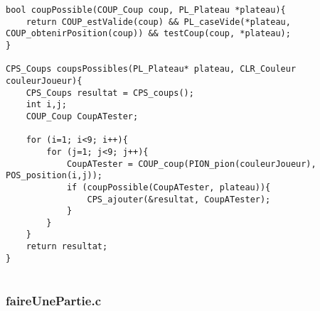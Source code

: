 \begin{lstlisting}
bool coupPossible(COUP_Coup coup, PL_Plateau *plateau){
    return COUP_estValide(coup) && PL_caseVide(*plateau, COUP_obtenirPosition(coup)) && testCoup(coup, *plateau);
}

CPS_Coups coupsPossibles(PL_Plateau* plateau, CLR_Couleur couleurJoueur){
    CPS_Coups resultat = CPS_coups();
    int i,j;
    COUP_Coup CoupATester;

    for (i=1; i<9; i++){
        for (j=1; j<9; j++){
            CoupATester = COUP_coup(PION_pion(couleurJoueur), POS_position(i,j));
            if (coupPossible(CoupATester, plateau)){
                CPS_ajouter(&resultat, CoupATester);
            }
        }
    }
    return resultat;
}
  
\end{lstlisting}

\subsubsection{faireUnePartie.c}
